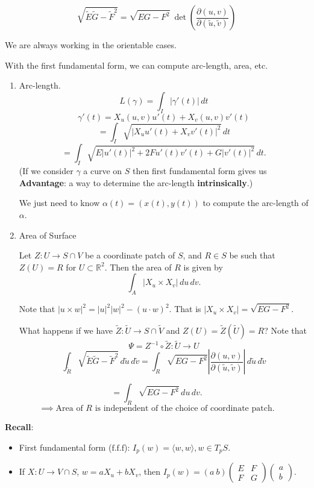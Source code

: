 \documentclass{article}
\begin{document}
\begin{corollary}
\[
\sqrt{\tilde{E}\tilde{G}-\tilde{F}^2} = \sqrt{EG-F^2} \ \det \left( \frac{\partial (u, v)}{\partial (\tilde{u}, \tilde{v})} \right)
\]
\begin{remark}
    We are always working in the orientable cases.
\end{remark}
\end{corollary}

With the first fundamental form, we can compute arc-length, area, etc.

\begin{enumerate}
    \item Arc-length.
    $$L(\gamma) = \int_I |\gamma'(t)| \, dt$$
    $$\gamma'(t) = X_u(u, v) u'(t) + X_v(u, v) v'(t)$$
    $$= \int_I \sqrt{|X_u u'(t) + X_v v'(t)|^2} \, dt$$
    $$= \int_I \sqrt{E |u'(t)|^2 + 2F u'(t) v'(t) + G |v'(t)|^2} \, dt.$$
    (If we consider $\gamma$ a curve on $S$ then first fundamental form gives us \textbf{Advantage}: a way to determine the arc-length \textbf{intrinsically}.)

    We just need to know $\alpha(t) = (x(t), y(t))$ to compute the arc-length of $\alpha$.

    \item Area of Surface
    \begin{definition}
        Let $Z: U \to S \cap V$ be a coordinate patch of $S$, and $R \in S$ be such that $Z(U) = R$ for $U \subset \mathbb{R}^2$. Then the area of $R$ is given by
        $$\int_A |X_u \times X_v| \, du \, dv.$$
    \end{definition}
    Note that $|u \times w|^2 = |u|^2 |w|^2 - (u \cdot w)^2$.
    That is $|X_u \times X_v| = \sqrt{EG - F^2}$.

    What happens if we have $\tilde{Z}: \tilde{U} \to S \cap \tilde{V}$ and $Z(U) = \tilde{Z}(\tilde{U}) = R$?
    Note that
    $$\Psi = Z^{-1} \circ \tilde{Z}: \tilde{U} \to U$$
    $$\int_{\tilde{R}} \sqrt{\tilde{E} \tilde{G} - \tilde{F}^2} \, d\tilde{u} \, d\tilde{v} = \int_R \sqrt{E G - F^2} \left|\frac{\partial(u, v)}{\partial(\tilde{u}, \tilde{v})}\right| \, d\tilde{u} \, d\tilde{v}$$
\end{enumerate}

$$= \int_R \sqrt{EG - F^2} \, du \, dv.$$
$$ \implies \text{Area of } R \text{ is independent of the choice of coordinate patch.}$$

\begin{remark}
    \textbf{Recall}:
    \begin{itemize}
        \item First fundamental form ($\text{f.f.f}$): $I_p(w) = \langle w, w \rangle, w \in T_p S$.
        \item If $X: U \to V \cap S$, $w = a X_u + b X_v$, then $I_p(w) = (a \ b) \begin{pmatrix} E & F \\ F & G \end{pmatrix} \begin{pmatrix} a \\ b \end{pmatrix}$.
    \end{itemize}
\end{remark}
\end{document}
